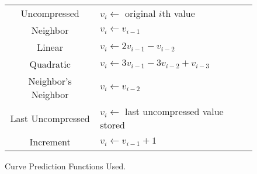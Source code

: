 \begin{figure}
	\centering
	\begin{tabular}{cl}
		Uncompressed & \(v_i \gets \) original \(i\)th value \\
		Neighbor & \(v_i \gets v_{i-1}\) \\
		Linear & \(v_i \gets 2v_{i-1} - v_{i-2}\) \\
		Quadratic & \(v_i \gets 3v_{i-1} - 3v_{i-2} + v_{i-3}\) \\
		Neighbor's Neighbor & \(v_i \gets v_{i-2}\) \\
		Last Uncompressed & \(v_i \gets\) last uncompressed value stored \\
		Increment & \(v_i \gets v_{i-1}+1\)
	\end{tabular}

	\caption{Curve Prediction Functions Used.}
	\label{fig:comp-sz-modes}
	
\end{figure}